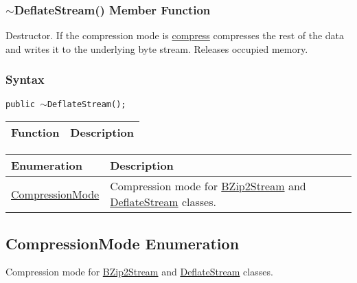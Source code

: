 \documentclass[a4paper,oneside,11.000000pt]{book}
\newcounter{subchapter}
\begin{document}
\hypertarget{System.IO.Compression.DeflateStream.destructor.P.System.IO.Compression.DeflateStream}{\subsubsection*{$\sim$DeflateStream() Member Function}}
\begin{flushleft}
Destructor. If the compression mode is \hyperlink{System.IO.Compression.CompressionMode.compress}{compress} compresses the rest of the data
and writes it to the underlying byte stream. Releases occupied memory.

\end{flushleft}
\subsubsection*{Syntax}\texttt{public $\sim$DeflateStream();}
\clearpage

\begin{flushleft}
\begin{supertabular}[l]{ll}
\textbf{Function}
& \textbf{Description}
\\
\hline
\end{supertabular}

\end{flushleft}
\clearpage
\clearpage
{}
\begin{flushleft}
\begin{supertabular}[l]{!{\raggedright}p{4.18998cm}!{\raggedright}p{10.96cm}}
\textbf{Enumeration}
& \textbf{Description}
\\
\hline
\hyperlink{System.IO.Compression.CompressionMode}{CompressionMode}
& Compression mode for \hyperlink{System.IO.Compression.BZip2Stream}{BZip2Stream} and \hyperlink{System.IO.Compression.DeflateStream}{DeflateStream} classes.

\\
\end{supertabular}

\end{flushleft}
\clearpage

\hypertarget{System.IO.Compression.CompressionMode}{\subsection{CompressionMode Enumeration}}
\begin{flushleft}
Compression mode for \hyperlink{System.IO.Compression.BZip2Stream}{BZip2Stream} and \hyperlink{System.IO.Compression.DeflateStream}{DeflateStream} classes.

\end{flushleft}
\end{document}
